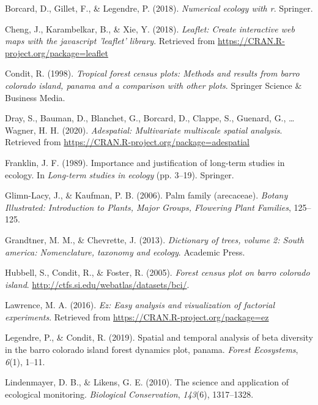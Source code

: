 \documentclass[11pt,]{article}
\begin{document}
\hypertarget{ref-borcard2018numerical}{}
Borcard, D., Gillet, F., \& Legendre, P. (2018). \emph{Numerical ecology
with r}. Springer.

\hypertarget{ref-Leaflet}{}
Cheng, J., Karambelkar, B., \& Xie, Y. (2018). \emph{Leaflet: Create
interactive web maps with the javascript 'leaflet' library}. Retrieved
from \url{https://CRAN.R-project.org/package=leaflet}

\hypertarget{ref-condit1998tropical}{}
Condit, R. (1998). \emph{Tropical forest census plots: Methods and
results from barro colorado island, panama and a comparison with other
plots}. Springer Science \& Business Media.

\hypertarget{ref-adespatial}{}
Dray, S., Bauman, D., Blanchet, G., Borcard, D., Clappe, S., Guenard,
G., \ldots{} Wagner, H. H. (2020). \emph{Adespatial: Multivariate
multiscale spatial analysis}. Retrieved from
\url{https://CRAN.R-project.org/package=adespatial}

\hypertarget{ref-franklin1989importance}{}
Franklin, J. F. (1989). Importance and justification of long-term
studies in ecology. In \emph{Long-term studies in ecology} (pp. 3--19).
Springer.

\hypertarget{ref-glimn2006palm}{}
Glimn-Lacy, J., \& Kaufman, P. B. (2006). Palm family (arecaceae).
\emph{Botany Illustrated: Introduction to Plants, Major Groups,
Flowering Plant Families}, 125--125.

\hypertarget{ref-grandtner2013dictionary}{}
Grandtner, M. M., \& Chevrette, J. (2013). \emph{Dictionary of trees,
volume 2: South america: Nomenclature, taxonomy and ecology}. Academic
Press.

\hypertarget{ref-Hubbell2005Barro}{}
Hubbell, S., Condit, R., \& Foster, R. (2005). \emph{Forest census plot
on barro colorado island}.
\url{http://ctfs.si.edu/webatlas/datasets/bci/}.

\hypertarget{ref-EZ}{}
Lawrence, M. A. (2016). \emph{Ez: Easy analysis and visualization of
factorial experiments}. Retrieved from
\url{https://CRAN.R-project.org/package=ez}

\hypertarget{ref-legendre2019spatial}{}
Legendre, P., \& Condit, R. (2019). Spatial and temporal analysis of
beta diversity in the barro colorado island forest dynamics plot,
panama. \emph{Forest Ecosystems}, \emph{6}(1), 1--11.

\hypertarget{ref-lindenmayer2010science}{}
Lindenmayer, D. B., \& Likens, G. E. (2010). The science and application
of ecological monitoring. \emph{Biological Conservation}, \emph{143}(6),
1317--1328.
\end{document}
